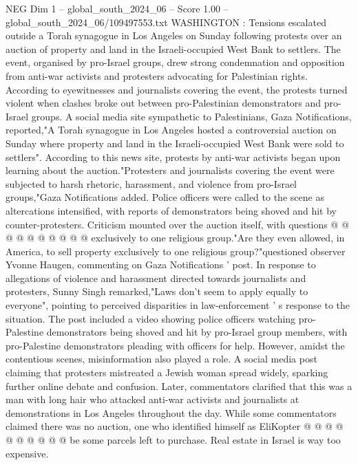 \begin{textsample}{NEG Dim 1 – global\_south\_2024\_06 – Score 1.00 – global\_south\_2024\_06/109497553.txt}  \label{ex:f1_neg_406}
WASHINGTON : Tensions escalated outside a Torah synagogue in Los Angeles on Sunday following protests over an auction of property and land in the Israeli-occupied West Bank to settlers.
The event, organised by pro-Israel groups, drew strong condemnation and opposition from anti-war activists and protesters advocating for Palestinian rights.
According to eyewitnesses and journalists covering the event, the protests turned violent when clashes broke out between pro-Palestinian demonstrators and pro-Israel groups.
A social media site sympathetic to Palestinians, Gaza Notifications, reported,"A Torah synagogue in Los Angeles hosted a controversial auction on Sunday where property and land in the Israeli-occupied West Bank were sold to settlers".
According to this news site, protests by anti-war activists began upon learning about the auction."Protesters and journalists covering the event were subjected to harsh rhetoric, harassment, and violence from pro-Israel groups,"Gaza Notifications added.
Police officers were called to the scene as altercations intensified, with reports of demonstrators being shoved and hit by counter-protesters.
Criticism mounted over the auction itself, with questions @ @ @ @ @ @ @ @ @ @ exclusively to one religious group."Are they even allowed, in America, to sell property exclusively to one religious group?"questioned observer Yvonne Haugen, commenting on Gaza Notifications ' post.
In response to allegations of violence and harassment directed towards journalists and protesters, Sunny Singh remarked,"Laws don't seem to apply equally to everyone", pointing to perceived disparities in law-enforcement ' s response to the situation.
The post included a video showing police officers watching pro-Palestine demonstrators being shoved and hit by pro-Israel group members, with pro-Palestine demonstrators pleading with officers for help.
However, amidst the contentious scenes, misinformation also played a role.
A social media post claiming that protesters mistreated a Jewish woman spread widely, sparking further online debate and confusion.
Later, commentators clarified that this was a man with long hair who attacked anti-war activists and journalists at demonstrations in Los Angeles throughout the day.
While some commentators claimed there was no auction, one who identified himself as EliKopter @ @ @ @ @ @ @ @ @ @ be some parcels left to purchase.
Real estate in Israel is way too expensive.

\end{textsample}
